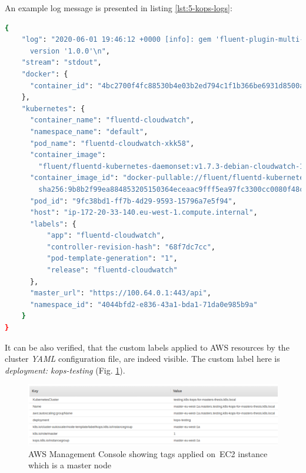 An example log message is presented in listing \ref{lst:5-kops-logs}:
\begin{lstlisting}[basicstyle=\scriptsize,xleftmargin=0cm,label=lst:5-kops-logs,caption={An example Kubernetes log message, presented on \textit{AWS CloudWatch}},captionpos=b,language=Bash,showstringspaces=false]
{
    "log": "2020-06-01 19:46:12 +0000 [info]: gem 'fluent-plugin-multi-format-parser'\
      version '1.0.0'\n",
    "stream": "stdout",
    "docker": {
      "container_id": "4bc2700f4fc88530b4e03b2ed794c1f1b366be6931d8500a8ccf21503d2c5b97"
    },
    "kubernetes": {
      "container_name": "fluentd-cloudwatch",
      "namespace_name": "default",
      "pod_name": "fluentd-cloudwatch-xkk58",
      "container_image":
        "fluent/fluentd-kubernetes-daemonset:v1.7.3-debian-cloudwatch-1.0",
      "container_image_id": "docker-pullable://fluent/fluentd-kubernetes-daemonset@\
        sha256:9b8b2f99ea884853205150364eceaac9fff5ea97fc3300cc0080f48c3eac8b8a",
      "pod_id": "9fc38bd1-ff7b-4d29-9593-15796a7e5f94",
      "host": "ip-172-20-33-140.eu-west-1.compute.internal",
      "labels": {
          "app": "fluentd-cloudwatch",
          "controller-revision-hash": "68f7dc7cc",
          "pod-template-generation": "1",
          "release": "fluentd-cloudwatch"
      },
      "master_url": "https://100.64.0.1:443/api",
      "namespace_id": "4044bfd2-e836-43a1-bda1-71da0e985b9a"
    }
}
\end{lstlisting}


It can be also verified, that the custom labels applied to AWS resources by the cluster \textit{YAML} configuration file, are indeed visible. The custom label here is \textit{deployment: kops-testing} (Fig. \ref{fig:kops-master-ec2-custom-tags}).
\begin{figure}[H]
    \centering
    \includegraphics[width=16cm]{figures/kops-master-ec2-custom-tags.png}
    \captionsetup{justification=centering,margin=2cm}
    \caption{AWS Management Console showing tags applied on~EC2 instance which is a master node}
    \label{fig:kops-master-ec2-custom-tags}
\end{figure}

